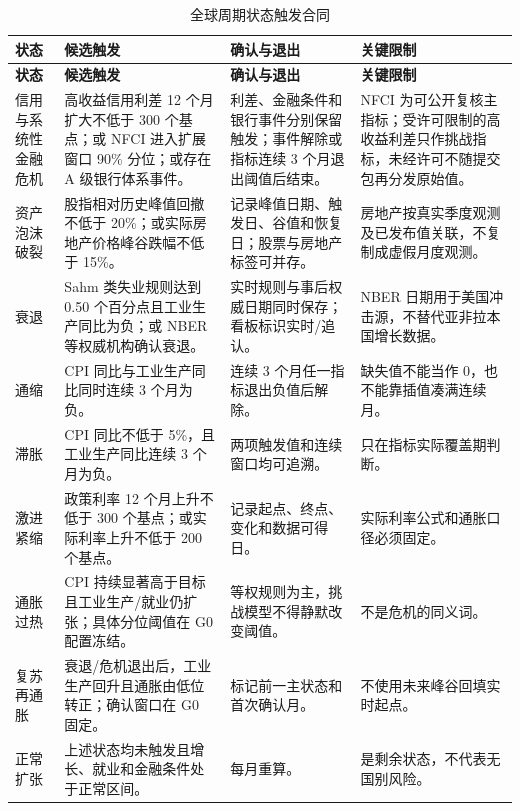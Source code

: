 \documentclass[UTF8,fontset=windows,12pt,openany]{ctexbook}
\begin{document}
\begin{landscape}
\begin{longtable}{p{3.1cm}p{6.8cm}p{5.2cm}p{4.4cm}}
\caption{全球周期状态触发合同}\label{tab:global-cycle-rules}\\
\toprule
\textbf{状态} & \textbf{候选触发} & \textbf{确认与退出} & \textbf{关键限制}\\
\midrule
\endfirsthead
\toprule \textbf{状态} & \textbf{候选触发} & \textbf{确认与退出} & \textbf{关键限制}\\ \midrule
\endhead
信用与系统性金融危机 & 高收益信用利差 12 个月扩大不低于 300 个基点；或 NFCI 进入扩展窗口 90\% 分位；或存在 A 级银行体系事件。 & 利差、金融条件和银行事件分别保留触发；事件解除或指标连续 3 个月退出阈值后结束。 & NFCI 为可公开复核主指标；受许可限制的高收益利差只作挑战指标，未经许可不随提交包再分发原始值。\\
资产泡沫破裂 & 股指相对历史峰值回撤不低于 20\%；或实际房地产价格峰谷跌幅不低于 15\%。 & 记录峰值日期、触发日、谷值和恢复日；股票与房地产标签可并存。 & 房地产按真实季度观测及已发布值关联，不复制成虚假月度观测。\\
衰退 & Sahm 类失业规则达到 0.50 个百分点且工业生产同比为负；或 NBER 等权威机构确认衰退。 & 实时规则与事后权威日期同时保存；看板标识实时/追认。 & NBER 日期用于美国冲击源，不替代亚非拉本国增长数据。\\
通缩 & CPI 同比与工业生产同比同时连续 3 个月为负。 & 连续 3 个月任一指标退出负值后解除。 & 缺失值不能当作 0，也不能靠插值凑满连续月。\\
滞胀 & CPI 同比不低于 5\%，且工业生产同比连续 3 个月为负。 & 两项触发值和连续窗口均可追溯。 & 只在指标实际覆盖期判断。\\
激进紧缩 & 政策利率 12 个月上升不低于 300 个基点；或实际利率上升不低于 200 个基点。 & 记录起点、终点、变化和数据可得日。 & 实际利率公式和通胀口径必须固定。\\
通胀过热 & CPI 持续显著高于目标且工业生产/就业仍扩张；具体分位阈值在 G0 配置冻结。 & 等权规则为主，挑战模型不得静默改变阈值。 & 不是危机的同义词。\\
复苏再通胀 & 衰退/危机退出后，工业生产回升且通胀由低位转正；确认窗口在 G0 固定。 & 标记前一主状态和首次确认月。 & 不使用未来峰谷回填实时起点。\\
正常扩张 & 上述状态均未触发且增长、就业和金融条件处于正常区间。 & 每月重算。 & 是剩余状态，不代表无国别风险。\\
\bottomrule
\end{longtable}
\end{landscape}
\end{document}
